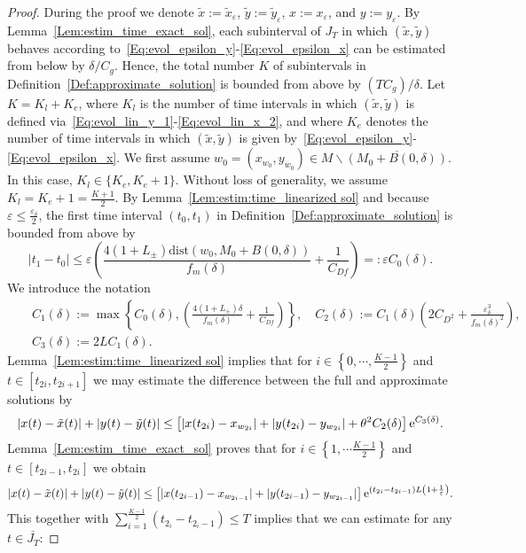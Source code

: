 \documentclass[12pt]{article}
\def\txte{{\textnormal{e}}}
\newcommand{\beann}{\begin{eqnarray*}}
\newcommand{\eeann}{\end{eqnarray*}}
\newcommand{\benn}{\begin{equation*}}
\newcommand{\eenn}{\end{equation*}}
\begin{document}
\begin{proof}
During the proof we denote $\tilde{x}:=\tilde{x}_{\varepsilon}$, 
$\tilde{y}:=\tilde{y}_{\varepsilon}$, $x:=x_\varepsilon$, and 
$y:=y_\varepsilon$. By Lemma~\ref{Lem:estim_time_exact_sol}, 
each subinterval of $J_T$ in which $(\tilde{x},\tilde{y})$ behaves according 
to~\eqref{Eq:evol_epsilon_y}-\eqref{Eq:evol_epsilon_x} can be estimated from 
below by $\delta/C_g$. Hence, the total number $K$ of subintervals 
in Definition~\ref{Def:approximate_solution} is bounded from above by 
$(TC_g)/\delta$. Let $K=K_{l}+K_{e}$, where $K_{l}$ is the number of 
time intervals in which $(\tilde{x},\tilde{y})$ is defined 
via~\eqref{Eq:evol_lin_y_1}-\eqref{Eq:evol_lin_x_2}, and where $K_{e}$ 
denotes the number of time intervals in which $(\tilde{x},\tilde{y})$ is
given by~\eqref{Eq:evol_epsilon_y}-\eqref{Eq:evol_epsilon_x}. We first 
assume $w_0=(x_{w_0},y_{w_0})\in M\backslash \overline{(M_0+B(0,\delta))}$. 
In this case, $K_{l}\in \{K_{e},K_e +1\}$.
Without loss of generality, we assume $K_{l}=K_e+1=\frac{K+1}{2}$.
By Lemma~\ref{Lem:estim:time_linearized sol} and because 
$\varepsilon\leq \frac{\varepsilon_\delta}{2}$, the first time 
interval $(t_0,t_1)$ in Definition~\ref{Def:approximate_solution} is bounded 
from above by
\benn
|t_1-t_0| \leq \varepsilon \left(  
\frac{4(1+L_\pm)\mathrm{dist}(w_0, M_0+B(0,\delta))}{f_m(\delta)}
+ \frac{1}{C_{Df}}\right)=:\varepsilon C_0(\delta).
\eenn
We introduce the notation
\beann
&&C_1(\delta):=\max \left\{C_0(\delta),\left( \frac{4(1+L_\pm)\delta}{f_m(\delta)}+ 
\frac{1}{C_{Df}}\right)\right\}, \quad 
C_2(\delta):= C_1(\delta)\left(2C_{D^2}+ 
\frac{\varepsilon_\delta^3}{f_m(\delta)^2}\right),\\
&&C_3(\delta):= 2L C_1(\delta).
\eeann
Lemma~\ref{Lem:estim:time_linearized sol} implies that for 
$i\in\left\{0,\cdots, \frac{K-1}{2}\right\}$ and $t\in [t_{2i},t_{2i+1}]$ 
we may estimate the difference between the full and approximate solutions
by
\benn
| x(t) - \tilde{x}(t)|+ | y(t) - \tilde{y}(t)|
\leq \left[ | x(t_{2i}) - x_{w_{2i}}| + | y(t_{2i}) - y_{w_{2i}}|+ 
\theta^2 C_2(\delta)\right]\txte^{C_3(\delta)}.
\eenn
Lemma~\ref{Lem:estim_time_exact_sol} proves that for 
$i\in\left\{1,\cdots \frac{K-1}{2}\right\}$ and $t\in [t_{2i-1},t_{2i}]$ 
we obtain
\benn
| x(t) - \tilde{x}(t)|+ | y(t) - \tilde{y}(t)|\leq 
\left[ | x(t_{2i-1}) - x_{w_{2i-1}}| + | y(t_{2i-1}) - y_{w_{2i-1}}|
\right]
\txte^{(t_{2i}-t_{2i-1})L \left(1+\frac{1}{\varepsilon}\right)}.
\eenn
This together with $\sum_{i=1}^{\frac{K-1}{2}}(t_{2_i}-t_{2_i-1})\leq T$ 
implies that we can estimate for any $t\in \overline{J_T}$:

\end{proof}
\end{document}
